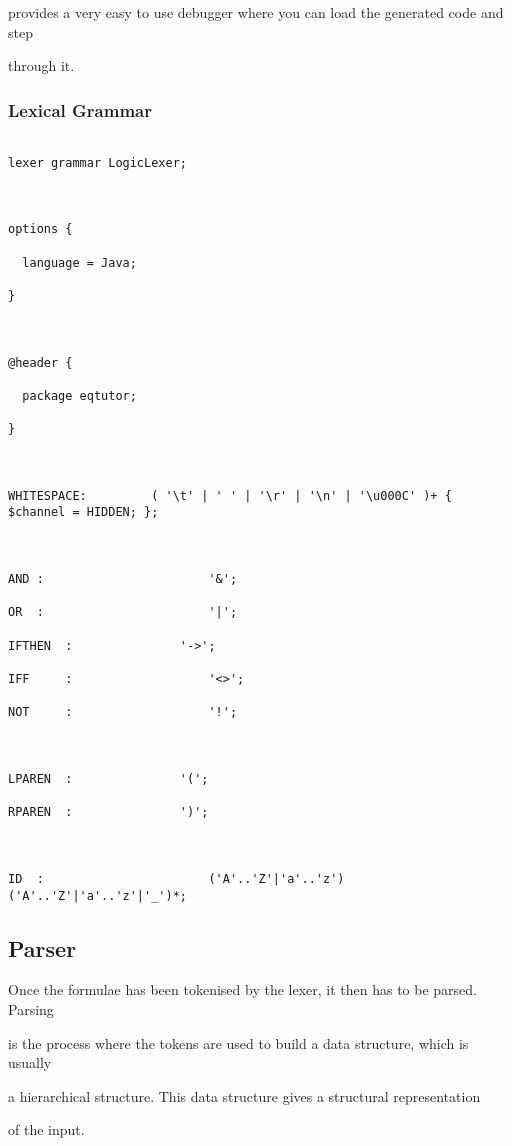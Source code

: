 \documentclass{report}
\begin{document}
provides a very easy to use debugger where you can load the generated code and step

through it. 



\subsubsection{Lexical Grammar}

\begin{verbatim}

lexer grammar LogicLexer;



options {

  language = Java;

}



@header {

  package eqtutor;

}



WHITESPACE:			( '\t' | ' ' | '\r' | '\n' | '\u000C' )+ { $channel = HIDDEN; };



AND	:						'&';

OR	:						'|';

IFTHEN	:				'->';

IFF 	:					'<>';

NOT 	:					'!';



LPAREN  :				'(';

RPAREN  :				')';



ID	:						('A'..'Z'|'a'..'z') ('A'..'Z'|'a'..'z'|'_')*;

\end{verbatim}



\subsection{Parser}



Once the formulae has been tokenised by the lexer, it then has to be parsed. Parsing

is the process where the tokens are used to build a data structure, which is usually

a hierarchical structure. This data structure gives a structural representation

of the input.
\end{document}
